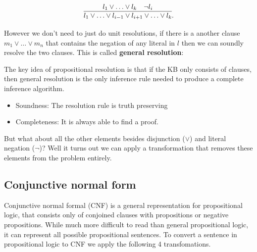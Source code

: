 \documentclass[11pt]{article}
\begin{document}
\[
  \infer{l_1 \lor \ldots \lor
    l_{i-1} \lor l_{i+1} \lor \ldots \lor l_k }{l_1 \lor \ldots
    \lor l_k &  \lnot l_i}.
\]


\noindent However we don't need to just do unit resolutions, if there is a another clause $m_1 \lor \ldots \lor m_n$ that contains the negation of any literal in $l$ then we can soundly resolve the two clauses. This is called \textbf{general resolution}:

\air

\air 

The key idea of propositional resolution is that if the KB only consists of clauses, then general resolution is the only inference rule needed to produce a complete inference algorithm.


\begin{itemize}
\item Soundness: The resolution rule is truth preserving
  
\item Completeness: It is always able to find a proof.
\end{itemize}

\noindent But what about all the other elements besides disjunction ($\lor$) and literal negation ($\lnot$)? Well it turns out we can apply a transformation that removes these elements from the problem entirely. 

\subsection{Conjunctive normal form}

Conjunctive normal formal (CNF) is a general representation for propositional logic, that consists only of conjoined clauses with propositions or negative propositions. While much more difficult to read than general propositional logic, it can represent all possible propositional sentences.  To convert a sentence in propositional logic to CNF we apply the following 4 transfomations.
\end{document}
